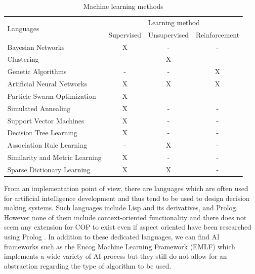 \documentclass[a4paper]{article}
\begin{document}
\begin{table}[bt]
\begin{tabular}{l c c c }
\hline
\multirow{2}{*}{Languages} & \multicolumn{3}{c}{Learning method} \\

 & Supervised	 & Unsupervised	& Reinforcement \\

\hline
Bayesian Networks	             & X & - & - \\

\hline
Clustering	                     & - & X & - \\

\hline
Genetic Algorithms             & - & - & X \\

\hline
Artificial Neural Networks     & X & X & X \\

\hline
Particle Swarm Optimization    & X & - &	- \\

\hline
Simulated Annealing            & X & - &	- \\

\hline
Support Vector Machines        & X & - & - \\

\hline
Decision Tree Learning         & X & - &	- \\

\hline
Association Rule Learning      & - &	X &	- \\

\hline
Similarity and Metric Learning & X &	- &	- \\

\hline
Sparse Dictionary Learning     & X & X &	- \\
\end{tabular}

  \caption{Machine learning methods}
  \label{table:machinelearning}
\end{table} 

From an implementation point of view, there are languages which are often used for artificial intelligence development and thus tend to be used to design decision making systems. Such languages include Lisp and its derivatives, and Prolog. However none of them include context-oriented functionality and there does not seem any extension for COP to exist even if aspect oriented have been researched using Prolog \cite{lohmann_aspect-oriented_2008}. In addition to these dedicated languages, we can find AI frameworks such as the Encog Machine Learning Framework (EMLF) which implements a wide variety of AI process but they still do not allow for an abstraction regarding the type of algorithm to be used.
\end{document}
